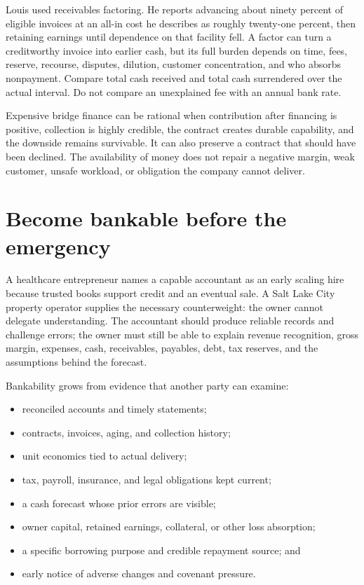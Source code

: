 Louis used receivables factoring. He reports advancing about ninety percent of
eligible invoices at an all-in cost he describes as roughly twenty-one percent,
then retaining earnings until dependence on that facility fell. A factor can
turn a creditworthy invoice into earlier cash, but its full burden depends on
time, fees, reserve, recourse, disputes, dilution, customer concentration, and
who absorbs nonpayment. Compare total cash received and total cash surrendered
over the actual interval. Do not compare an unexplained fee with an annual bank
rate.

Expensive bridge finance can be rational when contribution after financing is
positive, collection is highly credible, the contract creates durable
capability, and the downside remains survivable. It can also preserve a contract
that should have been declined. The availability of money does not repair a
negative margin, weak customer, unsafe workload, or obligation the company
cannot deliver.

\section{Become bankable before the emergency}

A healthcare entrepreneur names a capable accountant as an early scaling hire
because trusted books support credit and an eventual sale. A Salt Lake City
property operator supplies the necessary counterweight: the owner cannot
delegate understanding. The accountant should produce reliable records and
challenge errors; the owner must still be able to explain revenue recognition,
gross margin, expenses, cash, receivables, payables, debt, tax reserves, and the
assumptions behind the forecast.

Bankability grows from evidence that another party can examine:

\begin{itemize}[leftmargin=1.5em,itemsep=0.15em]
\item reconciled accounts and timely statements;
\item contracts, invoices, aging, and collection history;
\item unit economics tied to actual delivery;
\item tax, payroll, insurance, and legal obligations kept current;
\item a cash forecast whose prior errors are visible;
\item owner capital, retained earnings, collateral, or other loss absorption;
\item a specific borrowing purpose and credible repayment source; and
\item early notice of adverse changes and covenant pressure.
\end{itemize}

